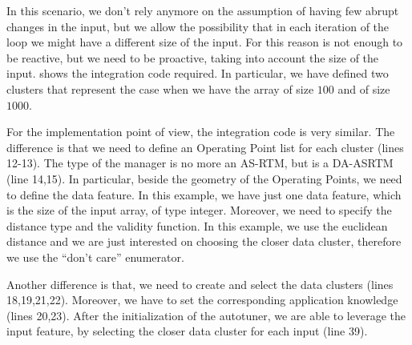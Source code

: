 In this scenario, we don't rely anymore on the assumption of having few abrupt changes in the input, but we allow the possibility that in each iteration of the loop we might have a different size of the input.
For this reason is not enough to be reactive, but we need to be proactive, taking into account the size of the input.
 shows the integration code required.
In particular, we have defined two clusters that represent the case when we have the array of size $100$ and of size $1000$.

For the implementation point of view, the integration code is very similar.
The difference is that we need to define an Operating Point list for each cluster (lines 12-13).
The type of the manager is no more an AS-RTM, but is a DA-ASRTM (line 14,15).
In particular, beside the geometry of the Operating Points, we need to define the data feature.
In this example, we have just one data feature, which is the size of the input array, of type integer.
Moreover, we need to specify the distance type and the validity function.
In this example, we use the euclidean distance and we are just interested on choosing the closer data cluster, therefore we use the ``don't care'' enumerator.


Another difference is that, we need to create and select the data clusters (lines 18,19,21,22).
Moreover, we have to set the corresponding application knowledge (lines 20,23).
After the initialization of the autotuner, we are able to leverage the input feature, by selecting the closer data cluster for each input (line 39).